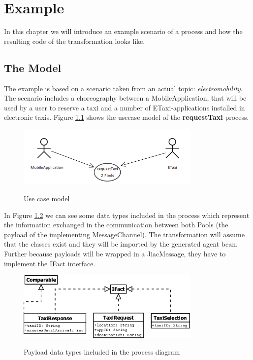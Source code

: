 \chapter{Example}
\label{chap:examples}

In this chapter we will introduce an example scenario of a process and how the resulting code of the transformation looks like.

\section{The Model}
The example is based on a scenario taken from an actual topic: \textit{electromobility}. The scenario includes a choreography between a MobileApplication, that will be used by a user to reserve a taxi and a number of ETaxi-applications installed in electronic taxis. Figure \ref{fig:usecase} shows the usecase model of the \textbf{requestTaxi} process. 
\begin{figure}[h]
	\centering
		\includegraphics[width=0.8\textwidth]{images/example/usecase.png}
	\label{fig:usecase}
	\caption{Use case model}
\end{figure}

In Figure \ref{fig:payloads} we can see some data types included in the process which represent the information exchanged in the communication between both Pools (the payload of the implementing MessageChannel). The transformation will assume that the classes exist and they will be imported by the generated agent bean. Further because payloads will be wrapped in a JiacMessage, they have to implement the IFact interface.
\begin{figure}[h]
	\centering
		\includegraphics[width=0.8\textwidth]{images/example/payloads.png}
	\label{fig:payloads}
	\caption{Payload data types included in the process diagram}
\end{figure}

